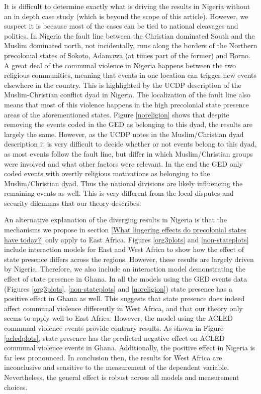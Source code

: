 It is difficult to determine exactly what is driving the results in Nigeria
without an in depth case study (which is beyond the scope of this article).
However, we suspect it is because most of the cases can be tied to national
cleavages and politics. In Nigeria the fault line between the Christian
dominated South and the Muslim dominated north, not incidentally, runs along the
borders of the Northern precolonial states of Sokoto, Adamawa (at times part of
the former) and Borno. A great deal of the communal violence in Nigeria happens
between the two religious communities, meaning that events in one location can
trigger new events elsewhere in the country. This is highlighted by the UCDP
description of the Muslim-Christian conflict dyad in Nigeria. The localization
of the fault line also means that most of this violence happens in the high
precolonial state presence areas of the aforementioned states. Figure
\ref{noreligion} shows that despite removing the events coded in the GED as
belonging to this dyad, the results are largely the same. However, as the UCDP
notes in the Muslim/Christian dyad description it is very difficult to decide
whether or not events belong to this dyad, as most events follow the fault line,
but differ in which Muslim/Christian groups were involved and what other factors
were relevant. In the end the GED only coded events with overtly religious
motivations as belonging to the Muslim/Christian dyad. Thus the national
divisions are likely influencing the remaining events as well. This is very
different from the local disputes and security dilemmas that our theory
describes. 

An alternative explanation of the diverging results in Nigeria is that the
mechanisms we propose in section \ref{What lingering effects do precolonial
states have today?} only apply to East Africa. Figures \ref{org3plots} and
\ref{non-stateplots} include interaction models for East and West Africa to
show how the effect of state presence differs across the regions. However, these
results are largely driven by Nigeria. Therefore, we also include an interaction
model demonstrating the effect of state presence in Ghana. In all the models
using the GED events data (Figures \ref{org3plots}, \ref{non-stateplots} and
\ref{noreligion}) state presence has a positive effect in Ghana as well. This
suggests that state presence does indeed affect communal violence differently in
West Africa, and that our theory only seems to apply well to East Africa.
However, the model using the ACLED communal violence events provide contrary
results. As shown in Figure \ref{acledplots}, state presence has the predicted
negative effect on ACLED communal violence events in Ghana. Additionally, the
positive effect in Nigeria is far less pronounced. In conclusion then, the
results for West Africa are inconclusive and sensitive to the measurement of the
dependent variable. Nevertheless, the general effect is robust across all models
and measurement choices.

